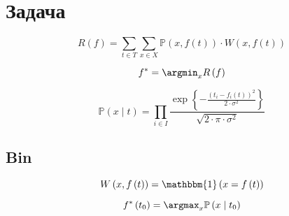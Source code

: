 \section{Задача}

\begin{equation*}
  R \left( f \right)
  = \sum\limits_{t \in T} \sum\limits_{x \in X}
    \mathbb{P} \left( x,  f\left( t \right) \right)
    \cdot W \left( x, f\left( t \right) \right)
\end{equation*}

\begin{equation*}
  f^* = \argmin_x R \left( f \right)
\end{equation*}

\begin{equation*}
  \mathbb{P}\left( x \mid t \right)
  = \prod_{i \in I}
    \frac{\exp{\left\{- \frac{\left( t_i - f_i\left( t \right) \right)^2}
         {2 \cdot \sigma^2} \right\}}}{\sqrt{2 \cdot \pi \cdot \sigma^2}}
\end{equation*}

\subsection{Bin}

\begin{equation*}
  W \left( x, f\left( t \right) \right)
  = \mathbbm{1} \left( x = f\left( t \right) \right)
\end{equation*}

\begin{equation*}
  f^* \left( t_0 \right)
  = \argmax_x \mathbb{P} \left( x \mid  t_0 \right)
\end{equation*}
